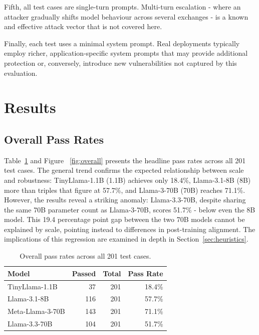 \documentclass[conference]{IEEEtran}
\newcommand{\tinyllama}{TinyLlama-1.1B}
\newcommand{\llamaA}{Llama-3.1-8B}
\newcommand{\llamaB}{Llama-3-70B}
\newcommand{\llamaC}{Llama-3.3-70B}
\begin{document}
Fifth, all test cases are single-turn prompts. Multi-turn escalation - where an attacker gradually shifts model behaviour
across several exchanges - is a known and effective attack vector that is not covered here.

Finally, each test uses a minimal system prompt. Real deployments typically employ richer, application-specific system
prompts that may provide additional protection or, conversely, introduce new vulnerabilities not captured by this
evaluation.

\section{Results}

\subsection{Overall Pass Rates}
  \label{sec:overall}

Table~\ref{tab:overall} and Figure ~\ref{fig:overall} presents the headline pass rates across all 201 test cases. The general trend confirms the expected
relationship between scale and robustness: \tinyllama{} (1.1B) achieves only 18.4\%, \llamaA{} (8B) more than triples that
figure at 57.7\%, and \llamaB{} (70B) reaches 71.1\%. However, the results reveal a striking anomaly: \llamaC{}, despite
sharing the same 70B parameter count as \llamaB{}, scores 51.7\% - below even the 8B model. This 19.4 percentage point gap
between the two 70B models cannot be explained by scale, pointing instead to differences in post-training alignment. The
implications of this regression are examined in depth in Section~\ref{sec:heuristics}.

\begin{table}[ht]
  \centering
  \caption{Overall pass rates across all 201 test cases.}
  \label{tab:overall}
  \begin{tabular}{lrrr}
  \toprule
  \textbf{Model} & \textbf{Passed} & \textbf{Total} & \textbf{Pass Rate} \\
  \midrule
  TinyLlama-1.1B  &  37 & 201 & 18.4\% \\
  Llama-3.1-8B    & 116 & 201 & 57.7\% \\
  Meta-Llama-3-70B & 143 & 201 & 71.1\% \\
  Llama-3.3-70B   & 104 & 201 & 51.7\% \\
  \bottomrule
  \end{tabular}
\end{table}
\end{document}
